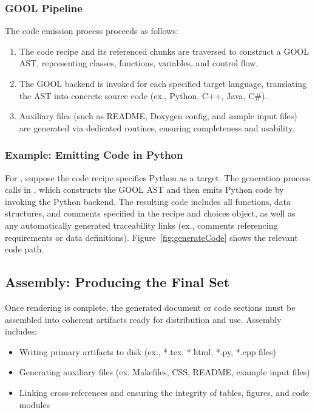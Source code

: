 \subsubsection{GOOL Pipeline}
The code emission process proceeds as follows:
\begin{enumerate}
    \item The code recipe and its referenced chunks are traversed to construct 
    a GOOL AST, representing classes, functions, variables, and control flow.
    \item The GOOL backend is invoked for each specified target language, 
    translating the AST into concrete source code (ex., Python, C++, Java, 
    C\#).
    \item Auxiliary files (such as README, Doxygen config, and sample input 
    files) are generated via dedicated routines, ensuring completeness and 
    usability.
\end{enumerate}
\subsubsection{Example: Emitting \gb{} Code in Python}
For \gb{}, suppose the code recipe specifies Python as a target. The 
generation process calls  in 
, which constructs the GOOL 
AST and then emits Python code by invoking the Python backend. The resulting 
code includes all functions, data structures, and comments specified in the 
recipe and choices object, as well as any automatically generated traceability 
links (ex., comments referencing requirements or data definitions). 
Figure~\ref{fig:generateCode} shows the relevant code path.


\subsection{Assembly: Producing the Final \SF{} Set}
Once rendering is complete, the generated document or code sections must be 
assembled into coherent artifacts ready for distribution and use. Assembly 
includes:
\begin{itemize}
    \item Writing primary artifacts to disk (ex., *.tex, *.html, *.py, *.cpp 
    files)
    \item Generating auxiliary files (ex. Makefiles, CSS, README, example input 
    files)
    \item Linking cross-references and ensuring the integrity of tables, 
    figures, and code modules
\end{itemize}


